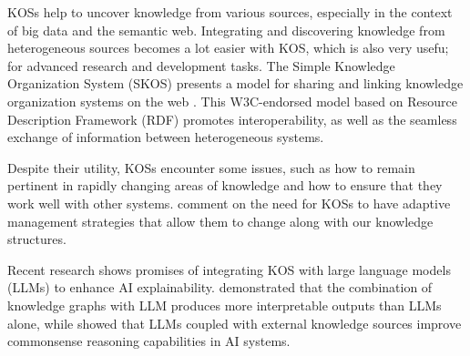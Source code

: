 KOSs help to uncover knowledge from various sources, especially in the context of big data and the semantic web. Integrating and discovering knowledge from heterogeneous sources becomes a lot easier with KOS, which is also very usefu; for advanced research and development tasks. The Simple Knowledge Organization System (SKOS) presents a model for sharing and linking knowledge organization systems on the web \cite{Miles:2009}. This W3C-endorsed model based on Resource Description Framework (RDF) promotes interoperability, as well as the seamless exchange of information between heterogeneous systems. 

Despite their utility, KOSs encounter some issues, such as how to remain pertinent in rapidly changing areas of knowledge and how to ensure that they work well with other systems. \cite{lauruhn:2016} comment on the need for KOSs to have adaptive management strategies that allow them to change along with our knowledge structures.

Recent research shows promises of integrating KOS with large language models (LLMs) to enhance AI explainability. \cite{ahmed:2023} demonstrated that the combination of knowledge graphs with LLM produces more interpretable outputs than LLMs alone, while \cite{krause:2024} showed that LLMs coupled with external knowledge sources improve commonsense reasoning capabilities in AI systems.